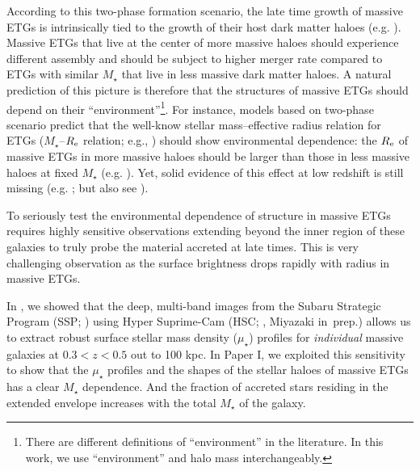 \documentclass[a4paper,fleqn,usenatbib]{mnras}
\def\mstar{{$M_{\star}$}}
\def\mden{{$\mu_{\star}$}}
\begin{document}
    According to this two-phase formation scenario, the late time growth of massive 
    ETGs is intrinsically tied to the growth of their host dark matter haloes 
    (e.g. \citealt{Leauthaud2012, Behroozi2013, Shankar2013}). 
    Massive ETGs that live at the center of more massive haloes should experience 
    different assembly and should be subject to higher merger rate compared to 
    ETGs with similar \mstar{} that live in less massive dark matter haloes. 
    A natural prediction of this picture is therefore that the structures of 
    massive ETGs should depend on their ``environment''\footnote{There are 
    different definitions of ``environment'' in the literature.  
    In this work, we use ``environment'' and halo mass interchangeably.}.
    For instance, models based on two-phase scenario predict that the well-know 
    stellar mass--effective radius relation for ETGs (\mstar{}--$R_{\rm e}$ relation; 
    e.g., \citealt{Shen2003, Guo2009}) should show environmental dependence: the 
    $R_{\rm e}$ of massive ETGs in more massive haloes should be larger than those 
    in less massive haloes at fixed \mstar{} 
    (e.g. \citealt{Shankar2013, Shankar2014}).
    Yet, solid evidence of this effect at low redshift is still missing 
    (e.g. \citealt{Nair2010, HCompany13}; but also see \citealt{Yoon2017}).
    
    
	
    To seriously test the environmental dependence of structure in massive ETGs 
    requires highly sensitive observations extending beyond the inner region of these 
    galaxies to truly probe the material accreted at late times. 
    This is very challenging observation as the surface brightness drops rapidly 
    with radius in massive ETGs. 
    
    In \citet[][Paper I hereafter]{hscMassiveI}, we showed that the deep, 
    multi-band images from the Subaru Strategic Program (SSP; \citealt{HSC-SSP,
    HSC-DR1}) using Hyper Suprime-Cam (HSC; \citealt{Miyazaki2012}, 
    Miyazaki in~prep.) allows us to extract robust surface stellar
    mass density (\mden{}) profiles for {\it individual} massive galaxies 
    at $0.3 < z < 0.5$ out to 100 kpc. 
    In Paper I, we exploited this sensitivity to show that the \mden{} profiles 
    and the shapes of the stellar haloes of massive ETGs has a clear \mstar{} 
    dependence. 
    And the fraction of accreted stars residing in the extended envelope increases
    with the total \mstar{} of the galaxy.
    
\end{document}
